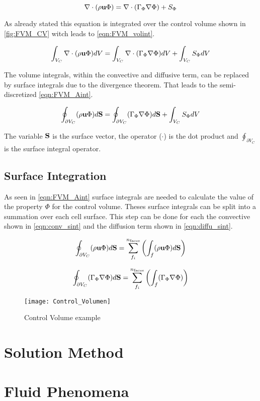 \documentclass[../thesis.tex]{subfiles}
\begin{document}
\begin{equation}
	\nabla \cdot (\rho \bold{u} \Phi) = \nabla \cdot (\Gamma_\Phi \nabla \Phi) + S_\Phi
\end{equation}

As already stated this equation is integrated over the control volume shown in \autoref{fig:FVM_CV} witch leads to \autoref{eqn:FVM_volint}.

\begin{equation}
	\label{eqn:FVM_volint}
	\int_{V_C} \nabla \cdot (\rho \bold{u} \Phi) dV = \int_{V_C} \nabla \cdot (\Gamma_\Phi \nabla \Phi) dV + \int_{V_C} S_\Phi dV
\end{equation}

The volume integrals, within the convective and diffusive term, can be replaced by surface integrals due to the divergence theorem. That leads to the semi-discretized \autoref{eqn:FVM_Aint}.

\begin{equation}
	\label{eqn:FVM_Aint}
	\oint_{\partial V_C} (\rho \bold{u} \Phi) d\bold{S} = \oint_{\partial V_C} (\Gamma_\Phi \nabla \Phi) d\bold{S} + \int_{V_C} S_\Phi dV
\end{equation}

The variable $ \bold{S}$ is the surface vector, the operator ($\cdot$) is the dot product and $ \oint_{\partial V_C}$ is the surface integral operator.

\subsection{Surface Integration}

As seen in \autoref{eqn:FVM_Aint} surface integrals are needed to calculate the value of the property $\Phi$ for the control volume. Theses surface integrals can be split into a summation over each cell surface. This step can be done for each the convective shown in \autoref{eqn:conv_sint} and the diffusion term shown in \autoref{eqn:diffu_sint}.

\begin{equation}
	\label{eqn:conv_sint}
	\oint_{\partial V_C} (\rho \bold{u} \Phi) d\bold{S} = \sum_{f_i}^{n_{\text{faces}}}\left( \int_{f} (\rho \bold{u} \Phi) d\bold{S} \right)
\end{equation}

\begin{equation}
	\label{eqn:diffu_sint}
	\oint_{\partial V_C} (\Gamma_\Phi \nabla \Phi) d\bold{S} =  \sum_{f_i}^{n_{\text{faces}}}\left( \int_{f} (\Gamma_\Phi \nabla \Phi) \right)
\end{equation} 

\begin{figure}[htbp]
	\centering
	\texttt{[image: Control\_Volumen]}
	\caption{Control Volume example}
	\label{fig:FVM_CV}
\end{figure}

\section{Solution Method}

\section{Fluid Phenomena}
\end{document}
